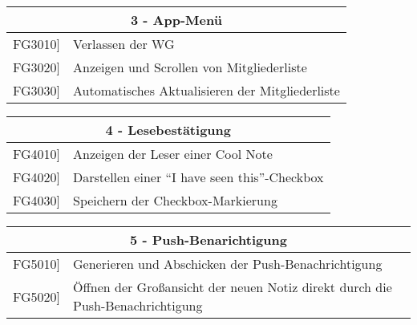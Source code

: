 \documentclass[a4paper]{scrreprt}
\begin{document}
    		\vspace{5mm}
    		
    		\begin{table}[h!]
    			\centering
    			\label{my-label}
    			\begin{tabular}{p{2cm}p{12cm}}
    				
    				\multicolumn{2}{c}{\textbf{3 - App-Menü}} \\ \hline
    				\centering{[}FG3010{]} & Verlassen der WG\\
    				\centering{[}FG3020{]} & Anzeigen und Scrollen von Mitgliederliste \\
    				\centering{[}FG3030{]} & Automatisches Aktualisieren der Mitgliederliste\\
    				\hline
    			\end{tabular}
    		\end{table}
    		
    		\vspace{5mm}
    		
    		\begin{table}[h!]
    			\centering
    			\label{my-label}
    			\begin{tabular}{p{2cm}p{12cm}}
    				
    				\multicolumn{2}{c}{\textbf{4 - Lesebestätigung}} \\ \hline
    				\centering{[}FG4010{]} & Anzeigen der Leser einer Cool Note\\
    				\centering{[}FG4020{]}& Darstellen einer “I have seen this”-Checkbox                               \\
    				\centering{[}FG4030{]}& Speichern der Checkbox-Markierung \\ 
    				
    				\hline
    			\end{tabular}
    		\end{table}
    		
    		\vspace{5mm}
    		
    		\begin{table}[h!]
    			\centering
    			\label{my-label}
    			\begin{tabular}{p{2cm}p{12cm}}
    				
    				\multicolumn{2}{c}{\textbf{5 - Push-Benarichtigung}} \\ \hline
    				\centering{[}FG5010{]} & Generieren und Abschicken der Push-Benachrichtigung\\
    				\centering{[}FG5020{]}&Öffnen der Großansicht der neuen Notiz direkt durch die Push-Benachrichtigung            \\ 
    				
    				\hline
    			\end{tabular}
    		\end{table}
    		
\end{document}
